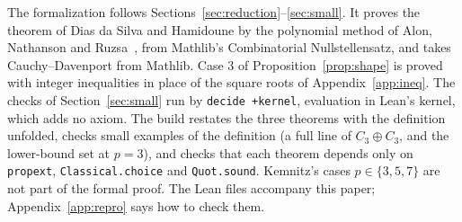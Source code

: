 \documentclass[11pt]{article}
\theoremstyle{remark}
\begin{document}
The formalization follows Sections~\ref{sec:reduction}--\ref{sec:small}. It proves the theorem of Dias da Silva and Hamidoune by the polynomial method of Alon, Nathanson and Ruzsa~\cite{ANR}, from Mathlib's Combinatorial Nullstellensatz, and takes Cauchy--Davenport from Mathlib. Case 3 of Proposition~\ref{prop:shape} is proved with integer inequalities in place of the square roots of Appendix~\ref{app:ineq}. The checks of Section~\ref{sec:small} run by \texttt{decide +kernel}, evaluation in Lean's kernel, which adds no axiom. The build restates the three theorems with the definition unfolded, checks small examples of the definition (a full line of $C_3\oplus C_3$, and the lower-bound set at $p=3$), and checks that each theorem depends only on \texttt{propext}, \texttt{Classical.choice} and \texttt{Quot.sound}. Kemnitz's cases $p\in\{3,5,7\}$ are not part of the formal proof. The Lean files accompany this paper; Appendix~\ref{app:repro} says how to check them.
\end{document}
